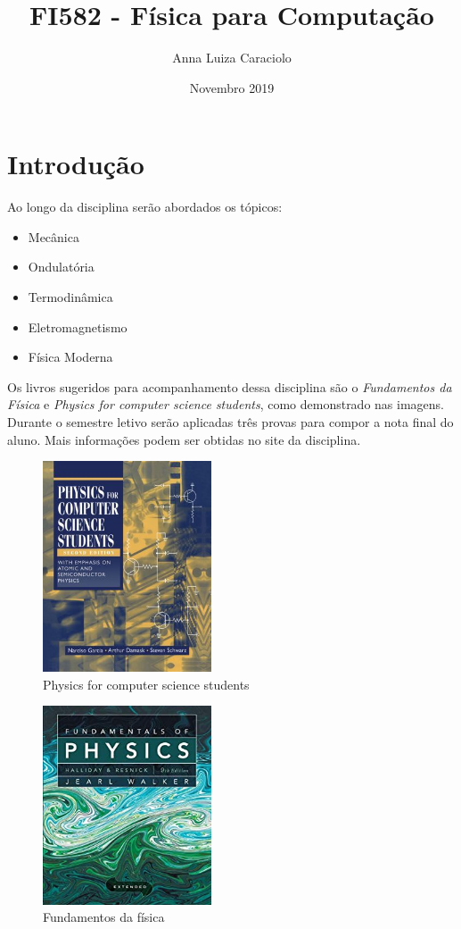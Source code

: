 \documentclass[a4 paper, 10pt]{article}
\title{FI582 - Física para Computação}
\author{Anna Luiza Caraciolo}
\date{Novembro 2019}
\begin{document}
\maketitle

\section{Introdução}
Ao longo da disciplina serão abordados os tópicos: 
\begin{itemize}
    \item Mecânica
    \item Ondulatória
    \item Termodinâmica
    \item Eletromagnetismo
    \item Física Moderna
\end{itemize}
 Os livros sugeridos para acompanhamento dessa disciplina são o \textit{Fundamentos da Física}\cite{Livro2} e \textit{Physics for computer science students}\cite{Livro1}, como demonstrado nas imagens. Durante o semestre letivo serão aplicadas três provas para compor a nota final do aluno. Mais informações podem ser obtidas no site da disciplina.\cite{FI582}
 \vspace{5mm}


\begin{figure}[h!]
\centering
\includegraphics[width=5cm]{Livro1.jpg}
\caption{Physics for computer science students}
\label{fig:Livro1}
\end{figure}

\begin{figure}[h!]
\centering
\includegraphics[width=5cm]{Livro2.jpg}
\caption{Fundamentos da física}
\label{fig:Livro2}
\end{figure}
\end{document}
